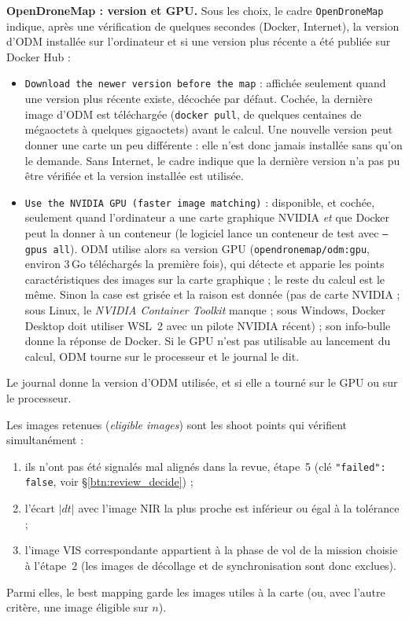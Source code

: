 \documentclass[a4paper,11pt]{report}
\begin{document}
\textbf{OpenDroneMap : version et GPU.} Sous les choix, le cadre \texttt{OpenDroneMap} indique, après une vérification de quelques secondes (Docker, Internet), la version d'ODM installée sur l'ordinateur et si une version plus récente a été publiée sur Docker Hub :
\begin{itemize}
	\item \texttt{Download the newer version before the map} : affichée seulement quand une version plus récente existe, décochée par défaut. Cochée, la dernière image d'ODM est téléchargée (\texttt{docker pull}, de quelques centaines de mégaoctets à quelques gigaoctets) avant le calcul. Une nouvelle version peut donner une carte un peu différente : elle n'est donc jamais installée sans qu'on le demande. Sans Internet, le cadre indique que la dernière version n'a pas pu être vérifiée et la version installée est utilisée.
	\item \texttt{Use the NVIDIA GPU (faster image matching)} : disponible, et cochée, seulement quand l'ordinateur a une carte graphique NVIDIA \emph{et} que Docker peut la donner à un conteneur (le logiciel lance un conteneur de test avec \texttt{--gpus all}). ODM utilise alors sa version GPU (\texttt{opendronemap/odm:gpu}, environ 3\,Go téléchargés la première fois), qui détecte et apparie les points caractéristiques des images sur la carte graphique ; le reste du calcul est le même. Sinon la case est grisée et la raison est donnée (pas de carte NVIDIA ; sous Linux, le \emph{NVIDIA Container Toolkit} manque ; sous Windows, Docker Desktop doit utiliser WSL~2 avec un pilote NVIDIA récent) ; son info-bulle donne la réponse de Docker. Si le GPU n'est pas utilisable au lancement du calcul, ODM tourne sur le processeur et le journal le dit.
\end{itemize}
Le journal donne la version d'ODM utilisée, et si elle a tourné sur le GPU ou sur le processeur.


Les images retenues (\emph{eligible images}) sont les shoot points qui vérifient simultanément :
\begin{enumerate}
	\item ils n'ont pas été signalés mal alignés dans la revue, étape~5 (clé \texttt{"failed": false}, voir §\ref{btn:review_decide}) ;
	\item l'écart $|dt|$ avec l'image NIR la plus proche est inférieur ou égal à la tolérance ;
	\item l'image VIS correspondante appartient à la phase de vol de la mission choisie à l'étape~2 (les images de décollage et de synchronisation sont donc exclues).
\end{enumerate}
Parmi elles, le best mapping garde les images utiles à la carte (ou, avec l'autre critère, une image éligible sur $n$).
\end{document}
